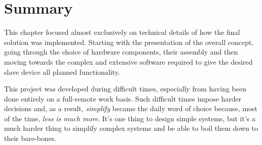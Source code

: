 \section{Summary} \label{sec:impl-summary}
This chapter focused almost exclusively on technical details of how the final solution was implemented.
Starting with the presentation of the overall concept, going through the choice of hardware components, their assembly and then moving towards the complex and extensive software required to give the desired slave device all planned functionality.

This project was developed during difficult times, especially from having been done entirely on a full-remote work basis.
Such difficult times impose harder decisions and, as a result, \emph{simplify} became the daily word of choice because, most of the time, \emph{less is much more}.
It's one thing to design simple systems, but it's a much harder thing to simplify complex systems and be able to boil them down to their bare-bones.
